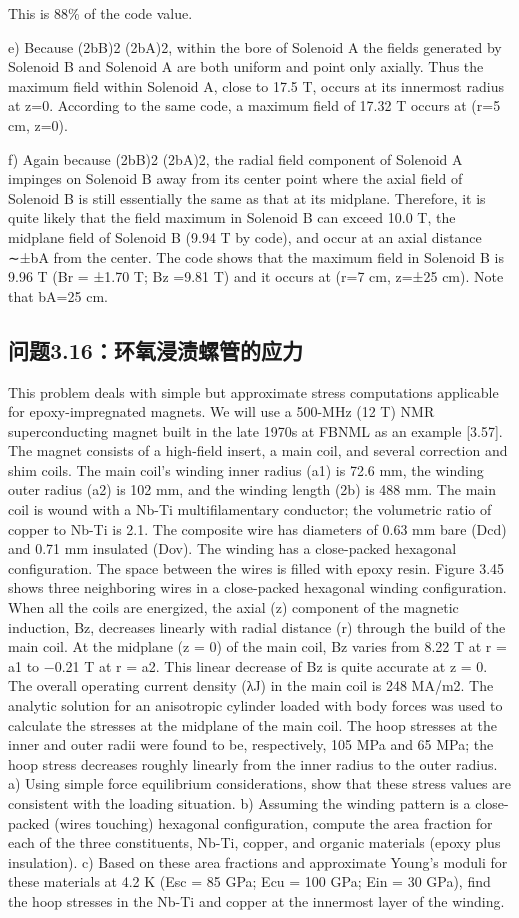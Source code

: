 This is 88\% of the code value.

e) Because (2bB)2   (2bA)2, within the bore of Solenoid A the fields generated
by Solenoid B and Solenoid A are both uniform and point only axially. Thus the
maximum field within Solenoid A, close to 17.5 T, occurs at its innermost radius at
z=0. According to the same code, a maximum field of 17.32 T occurs at (r=5 cm,
z=0).

f) Again because (2bB)2   (2bA)2, the radial field component of Solenoid A impinges on Solenoid B away from its center point where the axial field of Solenoid
B is still essentially the same as that at its midplane. Therefore, it is quite likely
that the field maximum in Solenoid B can exceed 10.0 T, the midplane field of
Solenoid B (9.94 T by code), and occur at an axial distance ∼±bA from the center.
The code shows that the maximum field in Solenoid B is 9.96 T (Br = ±1.70 T;
Bz =9.81 T) and it occurs at (r=7 cm, z=±25 cm). Note that bA=25 cm.
\newpage
\subsection{问题3.16：环氧浸渍螺管的应力}
This problem deals with simple but approximate stress computations applicable for
epoxy-impregnated magnets. We will use a 500-MHz (12 T) NMR superconducting magnet built in the late 1970s at FBNML as an example [3.57]. The magnet
consists of a high-field insert, a main coil, and several correction and shim coils.
The main coil’s winding inner radius (a1) is 72.6 mm, the winding outer radius
(a2) is 102 mm, and the winding length (2b) is 488 mm. The main coil is wound
with a Nb-Ti multifilamentary conductor; the volumetric ratio of copper to Nb-Ti
is 2.1. The composite wire has diameters of 0.63 mm bare (Dcd) and 0.71 mm insulated (Dov). The winding has a close-packed hexagonal configuration. The space
between the wires is filled with epoxy resin. Figure 3.45 shows three neighboring
wires in a close-packed hexagonal winding configuration.
When all the coils are energized, the axial (z) component of the magnetic induction, Bz, decreases linearly with radial distance (r) through the build of the main
coil. At the midplane (z = 0) of the main coil, Bz varies from 8.22 T at r = a1
to −0.21 T at r = a2. This linear decrease of Bz is quite accurate at z = 0. The
overall operating current density (λJ) in the main coil is 248 MA/m2.
The analytic solution for an anisotropic cylinder loaded with body forces was used
to calculate the stresses at the midplane of the main coil. The hoop stresses at
the inner and outer radii were found to be, respectively, 105 MPa and 65 MPa; the
hoop stress decreases roughly linearly from the inner radius to the outer radius.
a) Using simple force equilibrium considerations, show that these stress values
are consistent with the loading situation.
b) Assuming the winding pattern is a close-packed (wires touching) hexagonal
configuration, compute the area fraction for each of the three constituents,
Nb-Ti, copper, and organic materials (epoxy plus insulation).
c) Based on these area fractions and approximate Young’s moduli for these
materials at 4.2 K (Esc = 85 GPa; Ecu = 100 GPa; Ein = 30 GPa), find the
hoop stresses in the Nb-Ti and copper at the innermost layer of the winding.

